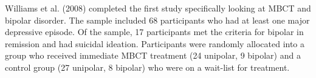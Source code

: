 Williams et al. (2008) completed the first study specifically looking at MBCT and bipolar disorder. The sample included 68 participants who had at least one major depressive episode. Of the sample, 17 participants met the criteria for bipolar in remission and had suicidal ideation. Participants were randomly allocated into a group who received immediate MBCT treatment (24 unipolar, 9 bipolar) and a control group (27 unipolar, 8 bipolar) who were on a wait-list for treatment.